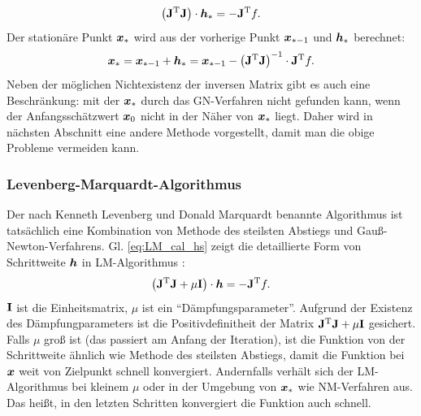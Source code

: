 \begin{equation}
\left ( \mathbf{J}^\mathrm{T} \mathbf{J} \right ) \cdot \boldsymbol h_{\ast}  = -\mathbf{J}^\mathrm{T}f.\label{eq:cal_NW_hs}
\end{equation}
Der stationäre Punkt $\boldsymbol x_{\ast}$ wird aus der vorherige Punkt $\boldsymbol x_{\ast-1}$ und $\boldsymbol h_{\ast}$ berechnet:
\begin{equation}
\boldsymbol x_{\ast} = \boldsymbol x_{\ast-1} + \boldsymbol h_{\ast} = \boldsymbol x_{\ast-1} - \left ( \mathbf{J}^\mathrm{T} \mathbf{J} \right )^\mathrm{-1} \cdot \mathbf{J}^\mathrm{T}f.\label{eq:newton-xs}
\end{equation} 
Neben der möglichen Nichtexistenz der inversen Matrix gibt es auch eine Beschränkung: mit der $\boldsymbol x_{\ast}$ durch das GN-Verfahren nicht gefunden kann, wenn der Anfangsschätzwert $\boldsymbol x_{0}$ nicht in der Näher von $\boldsymbol x_{\ast}$ liegt. Daher wird in nächsten Abschnitt eine andere Methode vorgestellt, damit man die obige Probleme vermeiden kann. 
\subsubsection{Levenberg-Marquardt-Algorithmus}
\label{Levenberg-Marquadt-Algorithmus}
Der nach Kenneth Levenberg und Donald Marquardt benannte Algorithmus ist tatsächlich eine Kombination von Methode des steilsten Abstiegs und Gauß-Newton-Verfahrens. Gl. \eqref{eq:LM_cal_hs} zeigt die detaillierte Form von Schrittweite $\boldsymbol h$ in LM-Algorithmus \cite{von2015einfuhrung}\cite{madsen2004methods}:
\begin{equation}
\left ( \mathbf{J}^\mathrm{T} \mathbf{J} + \mu\mathbf{I}\right ) \cdot \boldsymbol h  = -\mathbf{J}^\mathrm{T}f.
\label{eq:LM_cal_hs}
\end{equation}
$\mathbf{I}$ ist die Einheitsmatrix, $\mu$ ist ein ``Dämpfungsparameter''. Aufgrund der Existenz des Dämpfungparameters ist die Positivdefinitheit der Matrix $\mathbf{J}^\mathrm{T} \mathbf{J} + \mu\mathbf{I}$ gesichert. Falls $\mu$ groß ist (das passiert am Anfang der Iteration), ist die Funktion von der Schrittweite ähnlich wie Methode des steilsten Abstiegs, damit die Funktion bei $\boldsymbol x$ weit von Zielpunkt schnell konvergiert. Andernfalls verhält sich der LM-Algorithmus bei kleinem $\mu$ oder in der Umgebung von $\boldsymbol x_{\ast}$ wie NM-Verfahren aus. Das heißt, in den letzten Schritten konvergiert die Funktion auch schnell.

